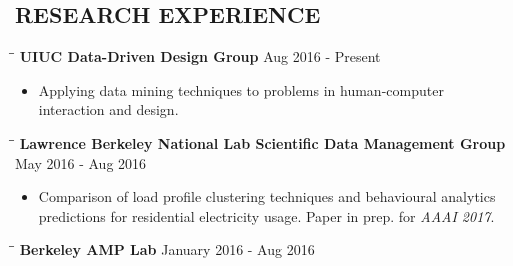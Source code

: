 \documentclass{res}
\begin{document}
\begin{resume}
\section{RESEARCH EXPERIENCE}
\vspace{-10pt}
     \begin{tabbing}
   \hspace{2.3in}\= \hspace{2.6in}\= \kill 
   \vspace{-20pt}
    {\bf UIUC Data-Driven Design Group}  \>\hspace{205pt}  Aug 2016 - Present
        \\ 
   \end{tabbing}    
    \begin{itemize}
     \vspace{-20pt}
     \item  Applying data mining techniques to problems in human-computer  \\interaction and design.
     \end{itemize}
\vspace{-20pt}     
     \begin{tabbing}
   \hspace{2.3in}\= \hspace{2.6in}\= \kill 
   \vspace{-20pt}
    {\bf Lawrence Berkeley National Lab Scientific Data Management Group}  \>\hspace{195pt}  May 2016 - Aug 2016
        \\ 
   \end{tabbing}    
    \begin{itemize}
     \vspace{-20pt}
     \item  Comparison of load profile clustering techniques and behavioural analytics \\predictions for residential electricity usage. Paper in prep. for \textit{AAAI 2017}.
     \end{itemize}
     \vspace{-20pt}   
     \begin{tabbing}
   \hspace{2.3in}\= \hspace{2.6in}\= \kill 
   \vspace{-20pt}
    {\bf Berkeley AMP Lab}  \>\hspace{180 pt}  January 2016 - Aug 2016

\end{tabbing}
\end{resume}
\end{document}
